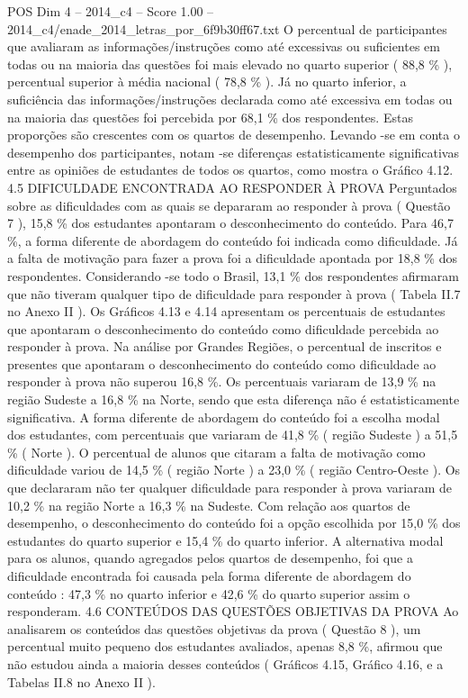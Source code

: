 \begin{textsample}{POS Dim 4 – 2014\_c4 – Score 1.00 – 2014\_c4/enade\_2014\_letras\_por\_6f9b30ff67.txt}
O percentual de participantes que avaliaram as informações/instruções como até excessivas ou suficientes em todas ou na maioria das questões foi mais elevado no quarto superior ( 88,8 \% ), percentual superior à média nacional ( 78,8 \% ).
Já no quarto inferior, a suficiência das informações/instruções declarada como até excessiva em todas ou na maioria das questões foi percebida por 68,1 \% dos respondentes.
Estas proporções são crescentes com os quartos de desempenho.
Levando -se em conta o desempenho dos participantes, notam -se diferenças estatisticamente significativas entre as opiniões de estudantes de todos os quartos, como mostra o Gráfico 4.12. 4.5 DIFICULDADE ENCONTRADA AO RESPONDER À PROVA Perguntados sobre as dificuldades com as quais se depararam ao responder à prova ( Questão 7 ), 15,8 \% dos estudantes apontaram o desconhecimento do conteúdo.
Para 46,7 \%, a forma diferente de abordagem do conteúdo foi indicada como dificuldade.
Já a falta de motivação para fazer a prova foi a dificuldade apontada por 18,8 \% dos respondentes.
Considerando -se todo o Brasil, 13,1 \% dos respondentes afirmaram que não tiveram qualquer tipo de dificuldade para responder à prova ( Tabela II.7 no Anexo II ).
Os Gráficos 4.13 e 4.14 apresentam os percentuais de estudantes que apontaram o desconhecimento do conteúdo como dificuldade percebida ao responder à prova.
Na análise por Grandes Regiões, o percentual de inscritos e presentes que apontaram o desconhecimento do conteúdo como dificuldade ao responder à prova não superou 16,8 \%.
Os percentuais variaram de 13,9 \% na região Sudeste a 16,8 \% na Norte, sendo que esta diferença não é estatisticamente significativa.
A forma diferente de abordagem do conteúdo foi a escolha modal dos estudantes, com percentuais que variaram de 41,8 \% ( região Sudeste ) a 51,5 \% ( Norte ).
O percentual de alunos que citaram a falta de motivação como dificuldade variou de 14,5 \% ( região Norte ) a 23,0 \% ( região Centro-Oeste ).
Os que declararam não ter qualquer dificuldade para responder à prova variaram de 10,2 \% na região Norte a 16,3 \% na Sudeste.
Com relação aos quartos de desempenho, o desconhecimento do conteúdo foi a opção escolhida por 15,0 \% dos estudantes do quarto superior e 15,4 \% do quarto inferior.
A alternativa modal para os alunos, quando agregados pelos quartos de desempenho, foi que a dificuldade encontrada foi causada pela forma diferente de abordagem do conteúdo : 47,3 \% no quarto inferior e 42,6 \% do quarto superior assim o responderam. 4.6 CONTEÚDOS DAS QUESTÕES OBJETIVAS DA PROVA Ao analisarem os conteúdos das questões objetivas da prova ( Questão 8 ), um percentual muito pequeno dos estudantes avaliados, apenas 8,8 \%, afirmou que não estudou ainda a maioria desses conteúdos ( Gráficos 4.15, Gráfico 4.16, e a Tabelas II.8 no Anexo II ).

\end{textsample}
